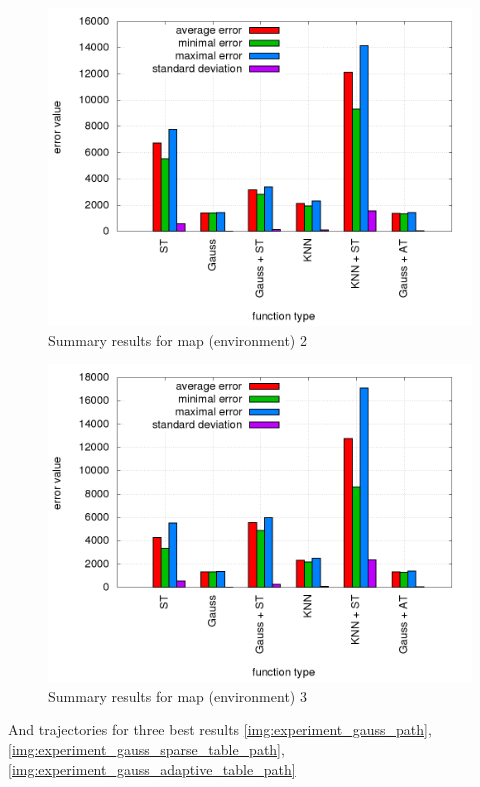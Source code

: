 \documentclass{acmbulletin}
\begin{document}
\begin{figure}[!htb]
\centering
\includegraphics[scale=.3]{../../results_q_learning/map_2/trials_average_results.png}
\caption{Summary results for map (environment) 2}
\label{img:experiment_average_2}
\end{figure}

\begin{figure}[!htb]
\centering
\includegraphics[scale=.3]{../../results_q_learning/map_3/trials_average_results.png}
\caption{Summary results for map (environment) 3}
\label{img:experiment_average_3}
\end{figure}

And trajectories for three best results
\ref{img:experiment_gauss_path},
\ref{img:experiment_gauss_sparse_table_path},
\ref{img:experiment_gauss_adaptive_table_path}
\end{document}
